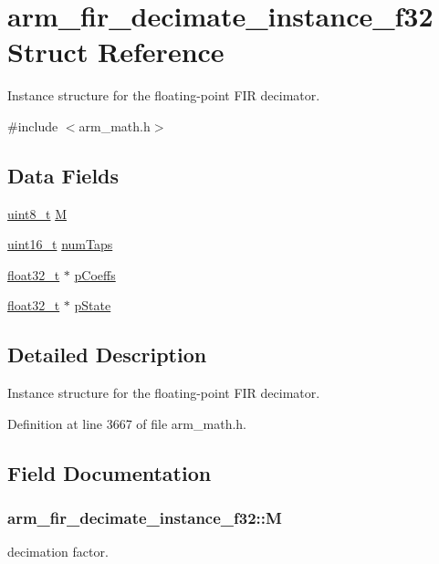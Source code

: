\hypertarget{structarm__fir__decimate__instance__f32}{\section{arm\-\_\-fir\-\_\-decimate\-\_\-instance\-\_\-f32 Struct Reference}
\label{structarm__fir__decimate__instance__f32}
}


Instance structure for the floating-\/point F\-I\-R decimator.  




{\ttfamily \#include $<$arm\-\_\-math.\-h$>$}

\subsection*{Data Fields}
\begin{DoxyCompactItemize}
\item 
\hyperlink{stdint_8h_aba7bc1797add20fe3efdf37ced1182c5}{uint8\-\_\-t} \hyperlink{structarm__fir__decimate__instance__f32_a76a8b2161731638eb3d67f277919f95d}{M}
\item 
\hyperlink{stdint_8h_a273cf69d639a59973b6019625df33e30}{uint16\-\_\-t} \hyperlink{structarm__fir__decimate__instance__f32_a2aa2986129db8affef03ede88dd45a03}{num\-Taps}
\item 
\hyperlink{arm__math_8h_a4611b605e45ab401f02cab15c5e38715}{float32\-\_\-t} $\ast$ \hyperlink{structarm__fir__decimate__instance__f32_a268a8b0e80a3d9764baf33e4bc10dde2}{p\-Coeffs}
\item 
\hyperlink{arm__math_8h_a4611b605e45ab401f02cab15c5e38715}{float32\-\_\-t} $\ast$ \hyperlink{structarm__fir__decimate__instance__f32_a5bddf29aaaf2011d2e3bcec59a83f633}{p\-State}
\end{DoxyCompactItemize}


\subsection{Detailed Description}
Instance structure for the floating-\/point F\-I\-R decimator. 

Definition at line 3667 of file arm\-\_\-math.\-h.



\subsection{Field Documentation}
\hypertarget{structarm__fir__decimate__instance__f32_a76a8b2161731638eb3d67f277919f95d}{
\subsubsection[{M}]{ arm\-\_\-fir\-\_\-decimate\-\_\-instance\-\_\-f32\-::\-M}}\label{structarm__fir__decimate__instance__f32_a76a8b2161731638eb3d67f277919f95d}
decimation factor. 

